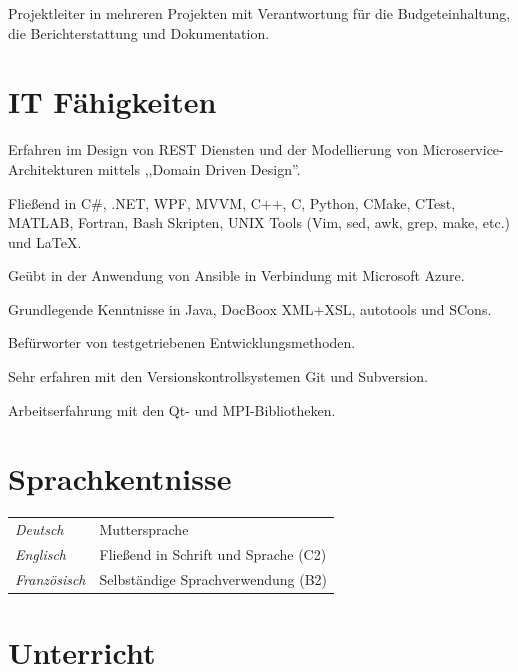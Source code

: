 \documentclass[line,11pt,a4paper]{../resume}
\begin{document}
\begin{resume}
\begin{list2}
  \item Projektleiter in mehreren Projekten mit Verantwortung für die
    Budgeteinhaltung, die Berichterstattung und Dokumentation.
\end{list2}

\pagebreak
\section{\mysidestyle IT Fähigkeiten}\vspace{6mm}
\begin{list2}
  \item Erfahren im Design von REST Diensten und der Modellierung von
    Microservice-Architekturen mittels ,,Domain Driven Design''.
  \item Flie{\ss}end in C\#, .NET, WPF, MVVM, C++, C, Python, CMake, CTest,
    MATLAB, Fortran, Bash Skripten, UNIX Tools (Vim, sed, awk, grep, make,
    etc.) und {\selectfont\LaTeX}.
  \item Geübt in der Anwendung von Ansible in Verbindung mit Microsoft Azure.
  \item Grundlegende Kenntnisse in Java, DocBoox XML+XSL, autotools und SCons.
  \item Befürworter von testgetriebenen Entwicklungsmethoden.
  \item Sehr erfahren mit den Versionskontrollsystemen Git und Subversion.
  \item Arbeitserfahrung mit den Qt- und MPI-Bibliotheken.
\end{list2}

\section{\mysidestyle Sprachkentnisse}\vspace{2mm}
\begin{tabular}{@{}ll}
  \textsl{Deutsch}   & Muttersprache \\
  \textsl{Englisch}  & Flie{\ss}end in Schrift und Sprache (C2) \\
  \textsl{Französisch}  & Selbständige Sprachverwendung (B2) \\
\end{tabular}

\section{\mysidestyle Unterricht}\vspace{2mm}


\end{resume}
\end{document}
